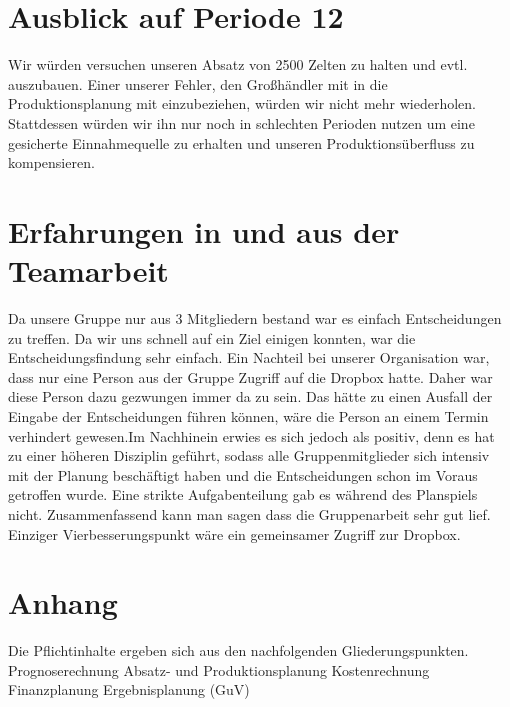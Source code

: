 \documentclass[a4paper, 12pt]{report}
\begin{document}
\begin{flushleft}
\chapter{Ausblick auf Periode 12}
Wir würden versuchen unseren Absatz von 2500 Zelten zu halten und evtl. auszubauen.
Einer unserer Fehler, den Großhändler mit in die Produktionsplanung mit einzubeziehen, würden wir nicht mehr wiederholen.
Stattdessen würden wir ihn nur noch in schlechten Perioden nutzen um eine gesicherte Einnahmequelle zu erhalten und unseren Produktionsüberfluss zu kompensieren.


\chapter{Erfahrungen in und aus der Teamarbeit}
Da unsere Gruppe nur aus 3 Mitgliedern bestand war es einfach Entscheidungen zu treffen.
Da wir uns schnell auf ein Ziel einigen konnten, war die Entscheidungsfindung sehr einfach.
Ein Nachteil bei unserer Organisation war, dass nur eine Person aus der Gruppe Zugriff auf die Dropbox hatte.
Daher war diese Person dazu gezwungen immer da zu sein.
Das hätte zu einen Ausfall der Eingabe der Entscheidungen führen können, wäre die Person an einem Termin verhindert gewesen.Im Nachhinein erwies es sich jedoch als positiv, denn es hat zu einer höheren Disziplin geführt, sodass alle Gruppenmitglieder sich intensiv mit der Planung beschäftigt haben und die Entscheidungen schon im Voraus getroffen wurde.
Eine strikte Aufgabenteilung gab es während des Planspiels nicht.
Zusammenfassend kann man sagen dass die Gruppenarbeit sehr gut lief.
Einziger Vierbesserungspunkt wäre ein gemeinsamer Zugriff zur Dropbox. 

\chapter{Anhang}



Die Pflichtinhalte ergeben sich aus den nachfolgenden Gliederungspunkten.
Prognoserechnung
Absatz- und Produktionsplanung
Kostenrechnung
Finanzplanung
Ergebnisplanung (GuV)

%
%


%
 

\end{flushleft}
\end{document}
